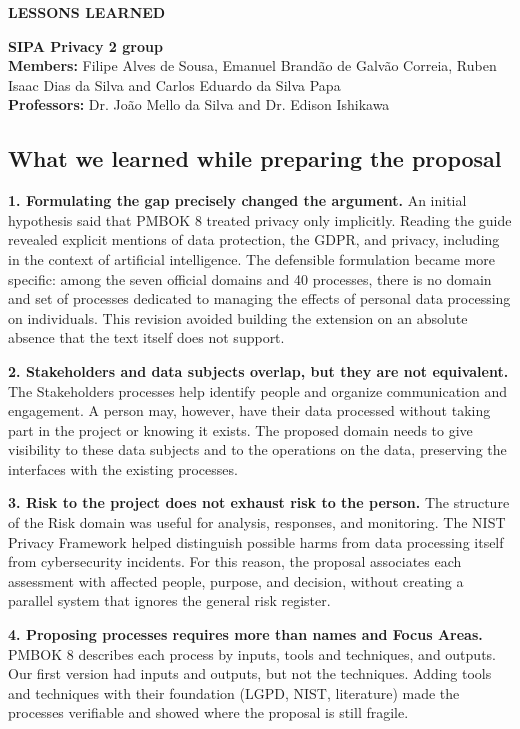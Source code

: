 \documentclass[12pt,a4paper,article,oneside,brazil,english]{abntex2}
\begin{document}
\SingleSpacing
\thispagestyle{plain}

\begin{center}\textbf{LESSONS LEARNED}\end{center}

\textbf{SIPA Privacy 2 group}\\ \textbf{Members:} Filipe Alves de Sousa, Emanuel Brandão de Galvão Correia, Ruben Isaac Dias da Silva and Carlos Eduardo da Silva Papa\\ \textbf{Professors:} Dr. João Mello da Silva and Dr. Edison Ishikawa

\subsection*{What we learned while preparing the proposal}

\textbf{1. Formulating the gap precisely changed the argument.} An initial hypothesis said that PMBOK 8 treated privacy only implicitly. Reading the guide revealed explicit mentions of data protection, the GDPR, and privacy, including in the context of artificial intelligence. The defensible formulation became more specific: among the seven official domains and 40 processes, there is no domain and set of processes dedicated to managing the effects of personal data processing on individuals. This revision avoided building the extension on an absolute absence that the text itself does not support.

\textbf{2. Stakeholders and data subjects overlap, but they are not equivalent.} The Stakeholders processes help identify people and organize communication and engagement. A person may, however, have their data processed without taking part in the project or knowing it exists. The proposed domain needs to give visibility to these data subjects and to the operations on the data, preserving the interfaces with the existing processes.

\textbf{3. Risk to the project does not exhaust risk to the person.} The structure of the Risk domain was useful for analysis, responses, and monitoring. The NIST Privacy Framework helped distinguish possible harms from data processing itself from cybersecurity incidents. For this reason, the proposal associates each assessment with affected people, purpose, and decision, without creating a parallel system that ignores the general risk register.

\textbf{4. Proposing processes requires more than names and Focus Areas.} PMBOK 8 describes each process by inputs, tools and techniques, and outputs. Our first version had inputs and outputs, but not the techniques. Adding tools and techniques with their foundation (LGPD, NIST, literature) made the processes verifiable and showed where the proposal is still fragile.
\end{document}
